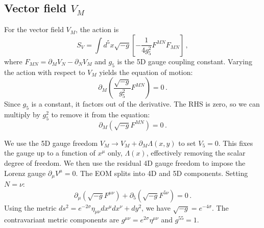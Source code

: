 \documentclass[11pt]{article}
\begin{document}
\subsection{Vector field $V_M$}
For the vector field $V_M$, the action is
\begin{equation}
S_V = \int d^5x \sqrt{-g} \left[ -\frac{1}{4 g_5^2} F^{MN} F_{MN} \right] \, ,
\end{equation}
where $F_{MN} = \partial_M V_N - \partial_N V_M$ and $g_5$ is the 5D gauge coupling constant.
Varying the action with respect to $V_M$ yields the equation of motion:
\begin{equation}
\partial_M \left( \frac{\sqrt{-g}}{g_5^2} F^{MN} \right) = 0 \, .
\end{equation}
Since $g_5$ is a constant, it factors out of the derivative. The RHS is zero, so we can multiply by $g_5^2$ to remove it from the equation:
\begin{equation}
\partial_M \left( \sqrt{-g} F^{MN} \right) = 0 \, .
\end{equation}

We use the 5D gauge freedom $V_M \to V_M + \partial_M \Lambda(x,y)$ to set $V_5 = 0$. This fixes the gauge up to a function of $x^\mu$ only, $\Lambda(x)$, effectively removing the scalar degree of freedom. We then use the residual 4D gauge freedom to impose the Lorenz gauge $\partial_\mu V^\mu = 0$.
The EOM splits into 4D and 5D components. Setting $N = \nu$:
\begin{equation}
\partial_\mu \left( \sqrt{-g} F^{\mu\nu} \right) + \partial_5 \left( \sqrt{-g} F^{5\nu} \right) = 0 \, .
\end{equation}
Using the metric $ds^2 = e^{-2\sigma} \eta_{\mu\nu} dx^\mu dx^\nu + dy^2$, we have $\sqrt{-g} = e^{-4\sigma}$.
The contravariant metric components are $g^{\mu\nu} = e^{2\sigma} \eta^{\mu\nu}$ and $g^{55} = 1$.
\end{document}
